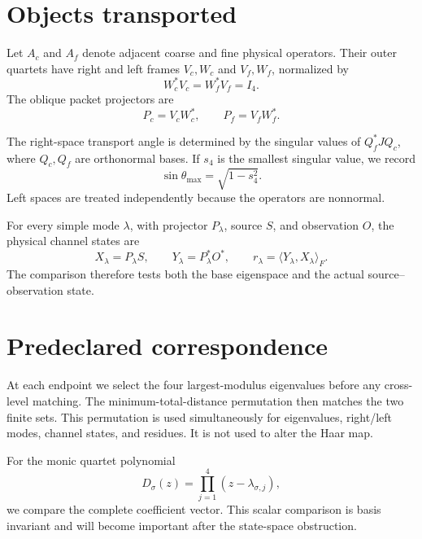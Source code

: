 \documentclass[12pt]{article}
\theoremstyle{remark}
\begin{document}
\section{Objects transported}

Let $A_c$ and $A_f$ denote adjacent coarse and fine physical operators.
Their outer quartets have right and left frames $V_c,W_c$ and $V_f,W_f$,
normalized by
\begin{equation}\label{eq:biorthogonal}
 W_c^*V_c=W_f^*V_f=I_4.
\end{equation}
The oblique packet projectors are
\begin{equation}\label{eq:projectors}
 P_c=V_cW_c^*,\qquad P_f=V_fW_f^*.
\end{equation}

The right-space transport angle is determined by the singular values of
$Q_f^*JQ_c$, where $Q_c,Q_f$ are orthonormal bases.  If $s_4$ is the smallest
singular value, we record
\begin{equation}\label{eq:angle}
 \sin\theta_{\max}=\sqrt{1-s_4^2}.
\end{equation}
Left spaces are treated independently because the operators are nonnormal.

For every simple mode $\lambda$, with projector $P_\lambda$, source $S$,
and observation $O$, the physical channel states are
\begin{equation}\label{eq:states}
 X_\lambda=P_\lambda S,
 \qquad Y_\lambda=P_\lambda^*O^*,
 \qquad r_\lambda=\langle Y_\lambda,X_\lambda\rangle_F.
\end{equation}
The comparison therefore tests both the base eigenspace and the actual
source--observation state.

\section{Predeclared correspondence}

At each endpoint we select the four largest-modulus eigenvalues before any
cross-level matching.  The minimum-total-distance permutation then matches
the two finite sets.  This permutation is used simultaneously for
eigenvalues, right/left modes, channel states, and residues.  It is not used
to alter the Haar map.

For the monic quartet polynomial
\begin{equation}\label{eq:quartic}
 D_\sigma(z)=\prod_{j=1}^4(z-\lambda_{\sigma,j}),
\end{equation}
we compare the complete coefficient vector.  This scalar comparison is
basis invariant and will become important after the state-space obstruction.
\end{document}
